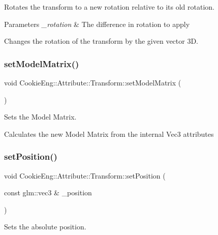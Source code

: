 Rotates the transform to a new rotation relative to its old rotation. 


\begin{DoxyParams}{Parameters}
{\em \+\_\+rotation} & The difference in rotation to apply\\
\hline
\end{DoxyParams}
Changes the rotation of the transform by the given vector 3D. \mbox{\label{class_cookie_eng_1_1_attribute_1_1_transform_a6311fcf34d2a2e2ff47d0e5b851bbff3}} 
\subsubsection{\texorpdfstring{set\+Model\+Matrix()}{setModelMatrix()}}
{\footnotesize\ttfamily void Cookie\+Eng\+::\+Attribute\+::\+Transform\+::set\+Model\+Matrix (\begin{DoxyParamCaption}{ }\end{DoxyParamCaption})}



Sets the Model Matrix. 

Calculates the new Model Matrix from the internal Vec3 attributes \mbox{\label{class_cookie_eng_1_1_attribute_1_1_transform_a797ca3b135ef16b9692afeda0ded859f}} 
\subsubsection{\texorpdfstring{set\+Position()}{setPosition()}}
{\footnotesize\ttfamily void Cookie\+Eng\+::\+Attribute\+::\+Transform\+::set\+Position (\begin{DoxyParamCaption}\item[{const glm\+::vec3 \&}]{\+\_\+position }\end{DoxyParamCaption})}



Sets the absolute position. 


